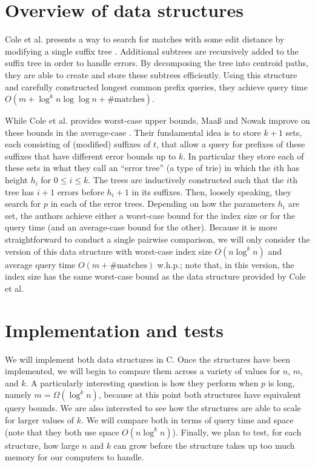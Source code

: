 \documentclass[11pt]{article}
\begin{document}
\section{Overview of data structures}

Cole et al. presents a way to search for matches with some edit distance by modifying a single suffix tree \cite{cole}.
Additional subtrees are recursively added to the suffix tree in order to handle errors. 
By decomposing the tree into centroid paths, they are able to create and store these subtrees efficiently.
Using this structure and carefully constructed longest common prefix queries, they achieve query time $O(m + \log^k{n} \log{\log{n}} + \text{\# matches})$. 

While Cole et al. provides worst-case upper bounds, Maa{\ss} and Nowak improve on these bounds in the average-case \cite{maas}.
Their fundamental idea is to store $k+1$ sets, each consisting of (modified) suffixes of $t$, that allow a query for prefixes of these suffixes that have different error bounds up to $k$.
In particular they store each of these sets in what they call an ``error tree'' (a type of trie) in which the $i$th has height $h_i$ for $0 \leq i \leq k$.
The trees are inductively constructed such that the $i$th tree has $i+1$ errors before $h_i + 1$ in its suffixes.
Then, loosely speaking, they search for $p$ in each of the error trees.
Depending on how the parameters $h_i$ are set, the authors achieve either a worst-case bound for the index size or for the query time (and an average-case bound for the other).
Because it is more straightforward to conduct a single pairwise comparison, we will only consider the version of this data structure with worst-case index size $O(n \log^k n)$ and average query time $O(m + \text{\# matches})$ w.h.p.; note that, in this version, the index size has the same worst-case bound as the data structure provided by Cole et al.

\section{Implementation and tests}

We will implement both data structures in C.
Once the structures have been implemented, we will begin to compare them across a variety of values for $n$, $m$, and $k$.
A particularly interesting question is how they perform when $p$ is long, namely $m = \Omega(\log^k{n})$, because at this point both structures have equivalent query bounds.
We are also interested to see how the structures are able to scale for larger values of $k$.
We will compare both in terms of query time and space (note that they both use space $O(n\log^k{n})$).
Finally, we plan to test, for each structure, how large $n$ and $k$ can grow before the structure takes up too much memory for our computers to handle. 
\end{document}
